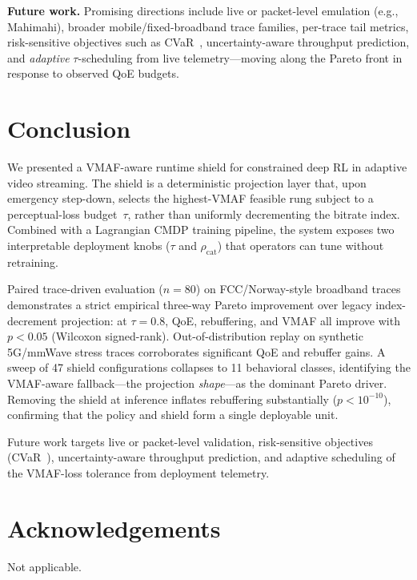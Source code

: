 \documentclass[preprint,12pt,times]{elsarticle}
\providecommand{\VNepisodes}{80}
\providecommand{\VShieldVariants}{47}
\providecommand{\VShieldBehaviors}{11}
\begin{document}
\textbf{Future work.}
Promising directions include live or packet-level emulation (e.g., Mahimahi), broader mobile/fixed-broadband trace families, per-trace tail metrics, risk-sensitive objectives such as CVaR~\cite{rockafellar2000}, uncertainty-aware throughput prediction, and \emph{adaptive} $\tau$-scheduling from live telemetry---moving along the Pareto front in response to observed QoE budgets.

\section{Conclusion}
\label{sec:conclusion}

We presented a VMAF-aware runtime shield for constrained deep RL in adaptive video streaming.
The shield is a deterministic projection layer that, upon emergency step-down, selects the highest-VMAF feasible rung subject to a perceptual-loss budget~$\tau$, rather than uniformly decrementing the bitrate index.
Combined with a Lagrangian CMDP training pipeline, the system exposes two interpretable deployment knobs ($\tau$ and $\rho_{\mathrm{cat}}$) that operators can tune without retraining.

Paired trace-driven evaluation ($n{=}\VNepisodes$) on FCC/Norway-style broadband traces demonstrates a strict empirical three-way Pareto improvement over legacy index-decrement projection: at $\tau{=}0.8$, QoE, rebuffering, and VMAF all improve with $p{<}0.05$ (Wilcoxon signed-rank).
Out-of-distribution replay on synthetic 5G/mmWave stress traces corroborates significant QoE and rebuffer gains.
A sweep of \VShieldVariants{} shield configurations collapses to \VShieldBehaviors{} behavioral classes, identifying the VMAF-aware fallback---the projection \emph{shape}---as the dominant Pareto driver.
Removing the shield at inference inflates rebuffering substantially ($p{<}10^{-10}$), confirming that the policy and shield form a single deployable unit.

Future work targets live or packet-level validation, risk-sensitive objectives (CVaR~\cite{rockafellar2000}), uncertainty-aware throughput prediction, and adaptive scheduling of the VMAF-loss tolerance from deployment telemetry.

\section*{Acknowledgements}
Not applicable.
\end{document}
